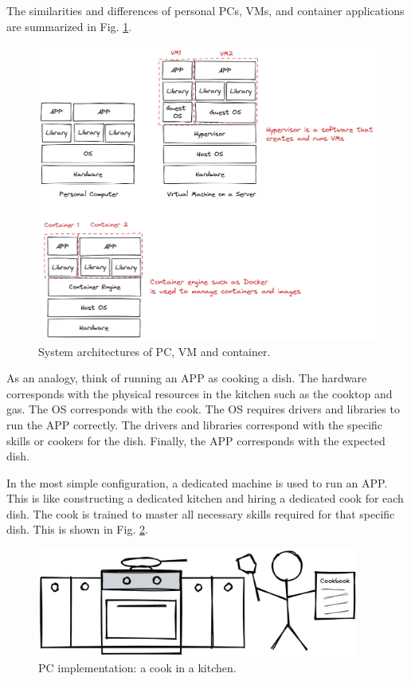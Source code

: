 The similarities and differences of personal PCs, VMs, and container applications are summarized in Fig. \ref{ch:vac:fig:pcvmcontainersructure}.

\begin{figure}[!htb]
	\centering
	\includegraphics[width=350pt]{chapters/part-3/figures/pcvmcontainerstructure.png}
	\caption{System architectures of PC, VM and container.} \label{ch:vac:fig:pcvmcontainersructure}
\end{figure}

As an analogy, think of running an APP as cooking a dish. The hardware corresponds with the physical resources in the kitchen such as the cooktop and gas. The OS corresponds with the cook. The OS requires drivers and libraries to run the APP correctly. The drivers and libraries correspond with the specific skills or cookers for the dish. Finally, the APP corresponds with the expected dish.

In the most simple configuration, a dedicated machine is used to run an APP. This is like constructing a dedicated kitchen and hiring a dedicated cook for each dish. The cook is trained to master all necessary skills required for that specific dish. This is shown in Fig. \ref{ch:vac:fig:acookinakitchen}.
\begin{figure}[htbp]
	\centering
	\includegraphics[width=300pt]{chapters/part-3/figures/acookinakitchen.png}
	\caption{PC implementation: a cook in a kitchen.} \label{ch:vac:fig:acookinakitchen}
\end{figure}

